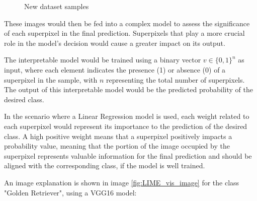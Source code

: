 \begin{figure}
\begin{subfigure}[t]{0.31\textwidth}
    \end{subfigure}
    \caption{New dataset samples}
    \label{fig:superpixel_samples}
\end{figure}

These images would then be fed into a complex model to assess the significance of each superpixel in the final prediction. 
Superpixels that play a more crucial role in the model's decision would cause a greater impact on its output.

The interpretable model would be trained using a binary vector \(v \in \{0, 1\}^n\) as input, where each element indicates the presence (1) or absence (0) of a superpixel in the sample, with \(n\) representing the total number of superpixels. 
The output of this interpretable model would be the predicted probability of the desired class.

In the scenario where a Linear Regression model is used, each weight related to each superpixel would represent its importance to the prediction of the desired class.
A high positive weight means that a superpixel positively impacts a probability value, meaning that the portion of the image occupied by the superpixel represents valuable information for the final prediction and should be aligned with the corresponding class, if the model is well trained.

\newpage

An image explanation is shown in image \ref{fig:LIME_vis_image} for the class "Golden Retriever", using a VGG16 model:


